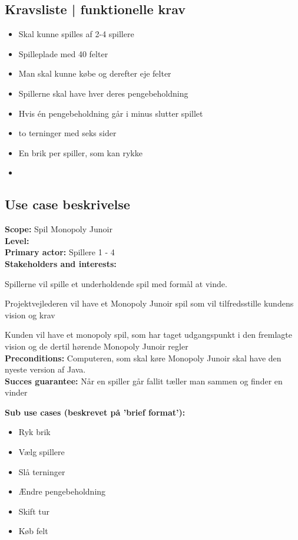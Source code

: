 \documentclass{article}
\begin{document}
\subsection{Kravsliste | funktionelle krav}
\begin{itemize}
    \item Skal kunne spilles af 2-4 spillere
    \item Spilleplade med 40 felter
    \item Man skal kunne købe og derefter eje felter
    \item Spillerne skal have hver deres pengebeholdning
    \item Hvis én pengebeholdning går i minus slutter spillet
    \item to terninger med seks sider
    \item En brik per spiller, som kan rykke
    \item 
\end{itemize}

\subsection{Use case beskrivelse }
\textbf{Scope:} Spil Monopoly Junoir  
\\
\textbf{Level:}
\\
\textbf{Primary actor:} Spillere 1 - 4 
\\
\textbf{Stakeholders and interests:} 
\item Spillerne vil spille et underholdende spil med formål at vinde. 
\item Projektvejlederen vil have et Monopoly Junoir spil som vil tilfredsstille kundens vision og krav
\item Kunden vil have et monopoly spil, som har taget udgangspunkt i den fremlagte vision og de dertil hørende Monopoly Junoir regler 
\\
\textbf{Preconditions:} Computeren, som skal køre Monopoly Junoir skal have den nyeste version af Java. 
\\
\textbf{Succes guarantee:} Når en spiller går fallit tæller man sammen og finder en vinder 

\textbf{Sub use cases (beskrevet på 'brief format'):}
\begin{itemize}
    \item Ryk brik
    \item Vælg spillere
    \item Slå terninger
    \item Ændre pengebeholdning
    \item Skift tur
    \item Køb felt
\end{itemize}
\end{document}
